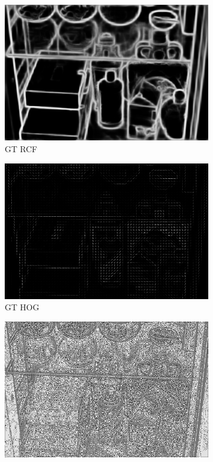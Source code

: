 \documentclass[a4paper]{ctexart}
\begin{document}
\begin{figure}[htb]
\begin{subfigure}{0.19\textwidth}
			\includegraphics[width=\linewidth]{picture/LLIE/My Architecture/Edge Detection/normal00044_rcf}
			\captionsetup{font=scriptsize}
			\caption{GT RCF}
			\label{fig: GT_rcf}
		\end{subfigure}
		\begin{subfigure}{0.19\textwidth}
			\includegraphics[width=\linewidth]{picture/LLIE/My Architecture/Edge Detection/normal00044_hog}
			\captionsetup{font=scriptsize}
			\caption{GT HOG}
			\label{fig: GT_hog}	
		\end{subfigure}
		\begin{subfigure}{0.19\textwidth}
			\includegraphics[width=\linewidth]{picture/LLIE/My Architecture/Edge Detection/normal00044_lbp}

\end{subfigure}
\end{figure}
\end{document}
